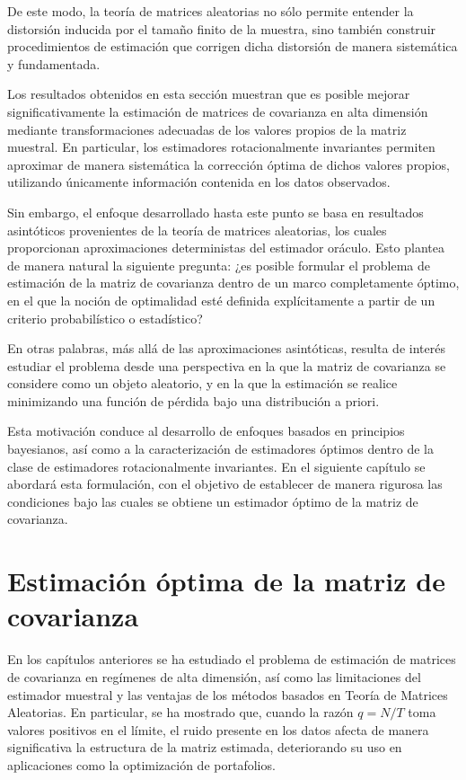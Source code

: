 \documentclass[letterpaper,12pt,oneside]{book}
\begin{document}
De este modo, la teoría de matrices aleatorias no sólo permite entender la distorsión inducida por el tamaño finito de la muestra, sino también construir procedimientos de estimación que corrigen dicha distorsión de manera sistemática y fundamentada.

Los resultados obtenidos en esta sección muestran que es posible mejorar significativamente la estimación de matrices de covarianza en alta dimensión mediante transformaciones adecuadas de los valores propios de la matriz muestral. En particular, los estimadores rotacionalmente invariantes permiten aproximar de manera sistemática la corrección óptima de dichos valores propios, utilizando únicamente información contenida en los datos observados.

Sin embargo, el enfoque desarrollado hasta este punto se basa en resultados asintóticos provenientes de la teoría de matrices aleatorias, los cuales proporcionan aproximaciones deterministas del estimador oráculo. Esto plantea de manera natural la siguiente pregunta: ¿es posible formular el problema de estimación de la matriz de covarianza dentro de un marco completamente óptimo, en el que la noción de optimalidad esté definida explícitamente a partir de un criterio probabilístico o estadístico?

En otras palabras, más allá de las aproximaciones asintóticas, resulta de interés estudiar el problema desde una perspectiva en la que la matriz de covarianza se considere como un objeto aleatorio, y en la que la estimación se realice minimizando una función de pérdida bajo una distribución a priori.

Esta motivación conduce al desarrollo de enfoques basados en principios bayesianos, así como a la caracterización de estimadores óptimos dentro de la clase de estimadores rotacionalmente invariantes. En el siguiente capítulo se abordará esta formulación, con el objetivo de establecer de manera rigurosa las condiciones bajo las cuales se obtiene un estimador óptimo de la matriz de covarianza.

\chapter{Estimación óptima de la matriz de covarianza}

En los capítulos anteriores se ha estudiado el problema de estimación de matrices de covarianza en regímenes de alta dimensión, así como las limitaciones del estimador muestral y las ventajas de los métodos basados en Teoría de Matrices Aleatorias. En particular, se ha mostrado que, cuando la razón $q = N/T$ toma valores positivos en el límite, el ruido presente en los datos afecta de manera significativa la estructura de la matriz estimada, deteriorando su uso en aplicaciones como la optimización de portafolios.
\end{document}
